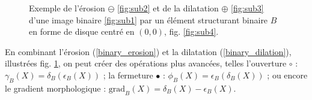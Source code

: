 \vspace{-1.5mm}
\begin{figure}[ht]
  \begin{center}
      \hfill
      \hfill
      \hfill
    \caption{ \centering Exemple de l'érosion $\ominus$ \ref{fig:sub2} et de la dilatation $\oplus$ \ref{fig:sub3} d'une image binaire \ref{fig:sub1} par un élément structurant binaire $B$ en forme de disque centré en $(0,0)$, fig. \ref{fig:sub4}.}
    \label{fig:morpho_binary_operations_example}
  \end{center}
\end{figure}

\vspace{-1.6mm}
En combinant l'érosion (\ref{binary_erosion}) et la dilatation (\ref{binary_dilation}), illustrées fig. \ref{fig:morpho_binary_operations_example}, on peut créer des opérations plus avancées, telles l'ouverture $\circ$ : $\gamma_B(X) = \delta_B(\epsilon_B(X))$ ; la fermeture $\bullet$ : $\phi_B(X) = \epsilon_B(\delta_B(X))$ ; ou encore le gradient morphologique : $\text{grad}_B(X)=\delta_B(X)-\epsilon_B(X)$.

\vfill

